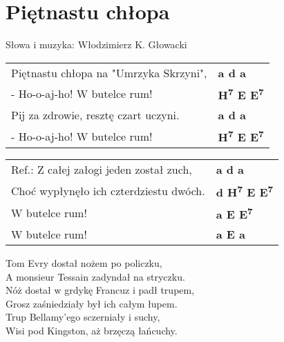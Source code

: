 \section{Piętnastu chłopa}

Słowa i muzyka: Włodzimierz K. Głowacki\\

\vspace{2em}
\begin{tabular}{@{}p{7cm}@{}l@{}}
Piętnastu chłopa na "Umrzyka Skrzyni",  & \bfseries   a d a \\
- Ho-o-aj-ho! W butelce rum!  & \bfseries   H\textsuperscript{7} E E\textsuperscript{7} \\
Pij za zdrowie, resztę czart uczyni.  & \bfseries   a d a \\
- Ho-o-aj-ho! W butelce rum!  & \bfseries   H\textsuperscript{7} E E\textsuperscript{7} \\
\end{tabular}

\vspace{1em}
\begin{tabular}{@{}p{7cm}@{}l@{}}
Ref.: Z całej załogi jeden został zuch,  & \bfseries   a d a \\
Choć wypłynęło ich czterdziestu dwóch.  & \bfseries   d H\textsuperscript{7} E E\textsuperscript{7} \\
W butelce rum!  & \bfseries   a E E\textsuperscript{7} \\
W butelce rum!  & \bfseries   a E a \\
\end{tabular}

\vspace{1em}
Tom Evry dostał nożem po policzku, \\
A monsieur Tessain zadyndał na stryczku. \\

Nóż dostał w grdykę Francuz i padł trupem, \\
Grosz zaśniedziały był ich całym łupem. \\

Trup Bellamy'ego sczerniały i suchy, \\
Wisi pod Kingston, aż brzęczą łańcuchy. \\